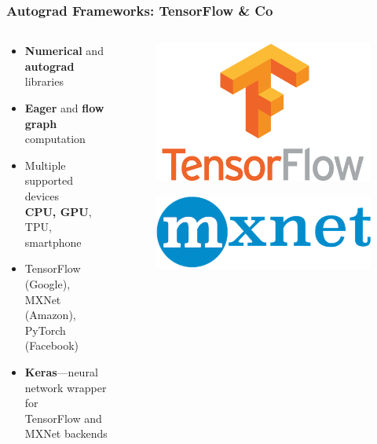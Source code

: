 \documentclass[aspectratio=1610]{beamer}
\newcommand\imageright[1]{ %
    \caption*{\scalebox{.5}{\textcolor{lightgray}{\textcopyright~#1}}} %
}
\begin{document}
\begin{frame}
\frametitle{Autograd Frameworks: TensorFlow \& Co}

\begin{columns}
    \begin{column}{0.48\textwidth}
        \begin{itemize}
            \item \textbf{Numerical} and \textbf{autograd} libraries
            \item \textbf{Eager} and \textbf{flow graph} computation
            \item Multiple supported devices\\
            \textbf{CPU, GPU}, TPU, smartphone
            \item TensorFlow (Google), MXNet (Amazon), PyTorch (Facebook)
            \item \textbf{Keras}---neural network wrapper for\\
            TensorFlow and MXNet backends
        \end{itemize}
    \end{column}
    \begin{column}{0.23\textwidth}
        \begin{figure}
            \centering
            \includegraphics[height=0.6\linewidth]{tensorflow.png}
            \imageright{Google}
        \end{figure}
        \vfill
        \begin{figure}
            \centering
            \includegraphics[width=0.9\linewidth]{mxnet.png}

\end{figure}
\end{column}
\end{columns}
\end{frame}
\end{document}
